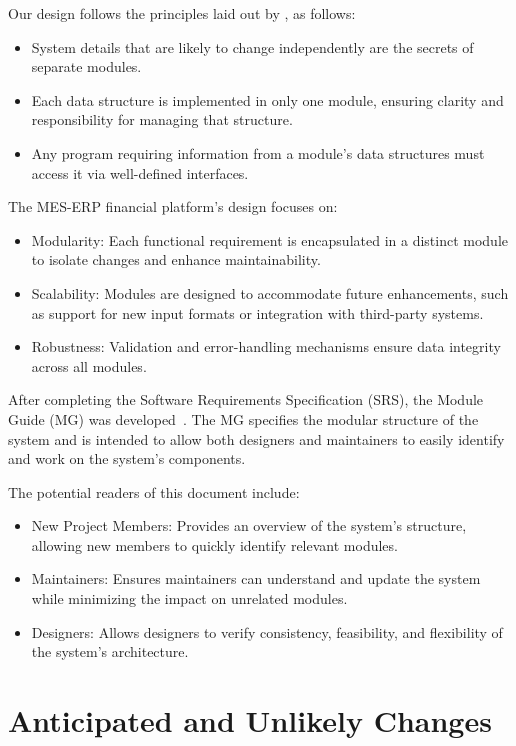 \documentclass[12pt, titlepage]{article}
\begin{document}
Our design follows the principles laid out by \citet{ParnasEtAl1984}, as follows:
\begin{itemize}
    \item System details that are likely to change independently are the secrets of separate modules.
    \item Each data structure is implemented in only one module, ensuring clarity and responsibility for managing that structure.
    \item Any program requiring information from a module's data structures must access it via well-defined interfaces.
\end{itemize}

The MES-ERP financial platform's design focuses on:
\begin{itemize}
    \item Modularity: Each functional requirement is encapsulated in a distinct module to isolate changes and enhance maintainability.
    \item Scalability: Modules are designed to accommodate future enhancements, such as support for new input formats or integration with third-party systems.
    \item Robustness: Validation and error-handling mechanisms ensure data integrity across all modules.
\end{itemize}

After completing the Software Requirements Specification (SRS), the Module Guide (MG) was developed~\citep{ParnasEtAl1984}. The MG specifies the modular structure of the system and is intended to allow both designers and maintainers to easily identify and work on the system's components.

The potential readers of this document include:
\begin{itemize}
    \item New Project Members: Provides an overview of the system's structure, allowing new members to quickly identify relevant modules.
    \item Maintainers: Ensures maintainers can understand and update the system while minimizing the impact on unrelated modules.
    \item Designers: Allows designers to verify consistency, feasibility, and flexibility of the system's architecture.
\end{itemize}

\section{Anticipated and Unlikely Changes} \label{SecChange}
\end{document}
